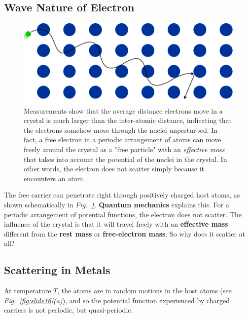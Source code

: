\subsection{Wave Nature of Electron}
\begin{figure}
\centering
\includegraphics[width=.75\columnwidth]{crystal_blochwave}
\caption{Measurements show that the average distance electrons move in a crystal is much larger than the inter-atomic distance, indicating that the electrons somehow move through the nuclei unperturbed.  In fact, a free electron in a periodic arrangement of atoms can move freely around the crystal as a "free particle" with an \emph{effective mass} that takes into account the potential of the nuclei in the crystal.  In other words, the electron does not scatter simply because it encounters an atom.}
\label{fig:slide15}
\end{figure}
 The free carrier can penetrate right through positively charged host atoms, as shown schematically in \emph{Fig.~\ref{fig:slide15}}.  \textbf{Quantum mechanics} explains this.  For a periodic arrangement of potential functions, the electron does not scatter. The influence of the crystal is that it will travel freely with an \textbf{effective mass} different from the \textbf{rest mass} or \textbf{free-electron mass}.  So why does it scatter at all?
 \newpage
\subsection{Scattering in Metals}
At temperature $T$, the atoms are in random motions in the host atoms (see \emph{Fig.~\ref{fig:slide16}(a)}), and so the potential function experienced by charged carriers is not periodic, but quasi-periodic. 

